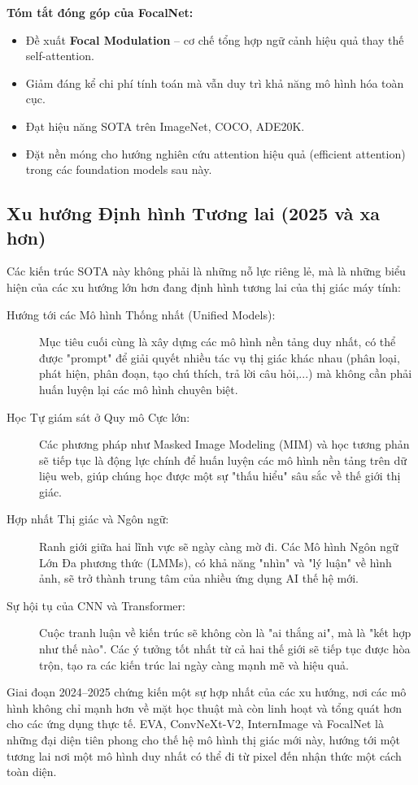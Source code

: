 \begin{mdframed}[style=infobox]
	\textbf{Tóm tắt đóng góp của FocalNet:}
	\begin{itemize}
		\item Đề xuất \textbf{Focal Modulation} – cơ chế tổng hợp ngữ cảnh hiệu quả thay thế self-attention.  
		\item Giảm đáng kể chi phí tính toán mà vẫn duy trì khả năng mô hình hóa toàn cục.  
		\item Đạt hiệu năng SOTA trên ImageNet, COCO, ADE20K.  
		\item Đặt nền móng cho hướng nghiên cứu attention hiệu quả (efficient attention) trong các foundation models sau này.
	\end{itemize}
\end{mdframed}

\subsection{Xu hướng Định hình Tương lai (2025 và xa hơn)}
\label{subsec:future_trends_2025}
Các kiến trúc SOTA này không phải là những nỗ lực riêng lẻ, mà là những biểu hiện của các xu hướng lớn hơn đang định hình tương lai của thị giác máy tính:
\begin{description}
	\item[Hướng tới các Mô hình Thống nhất (Unified Models):] Mục tiêu cuối cùng là xây dựng các mô hình nền tảng duy nhất, có thể được "prompt" để giải quyết nhiều tác vụ thị giác khác nhau (phân loại, phát hiện, phân đoạn, tạo chú thích, trả lời câu hỏi,...) mà không cần phải huấn luyện lại các mô hình chuyên biệt.
	\item[Học Tự giám sát ở Quy mô Cực lớn:] Các phương pháp như Masked Image Modeling (MIM) và học tương phản sẽ tiếp tục là động lực chính để huấn luyện các mô hình nền tảng trên dữ liệu web, giúp chúng học được một sự "thấu hiểu" sâu sắc về thế giới thị giác.
	\item[Hợp nhất Thị giác và Ngôn ngữ:] Ranh giới giữa hai lĩnh vực sẽ ngày càng mờ đi. Các Mô hình Ngôn ngữ Lớn Đa phương thức (LMMs), có khả năng "nhìn" và "lý luận" về hình ảnh, sẽ trở thành trung tâm của nhiều ứng dụng AI thế hệ mới.
	\item[Sự hội tụ của CNN và Transformer:] Cuộc tranh luận về kiến trúc sẽ không còn là "ai thắng ai", mà là "kết hợp như thế nào". Các ý tưởng tốt nhất từ cả hai thế giới sẽ tiếp tục được hòa trộn, tạo ra các kiến trúc lai ngày càng mạnh mẽ và hiệu quả.
\end{description}
Giai đoạn 2024–2025 chứng kiến một sự hợp nhất của các xu hướng, nơi các mô hình không chỉ mạnh hơn về mặt học thuật mà còn linh hoạt và tổng quát hơn cho các ứng dụng thực tế. EVA, ConvNeXt-V2, InternImage và FocalNet là những đại diện tiên phong cho thế hệ mô hình thị giác mới này, hướng tới một tương lai nơi một mô hình duy nhất có thể đi từ pixel đến nhận thức một cách toàn diện.

